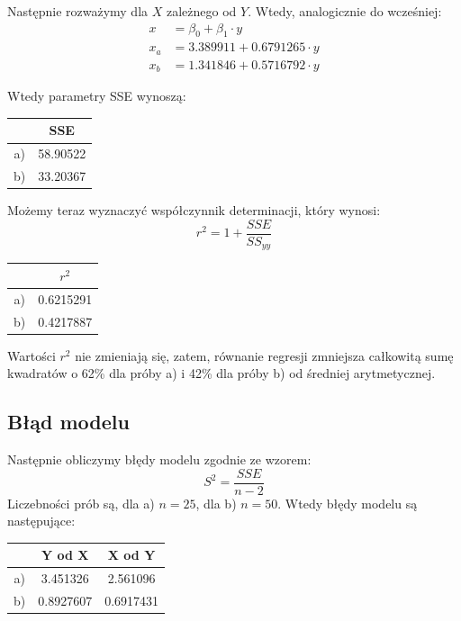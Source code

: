 \documentclass{article}
\begin{document}
Następnie rozważymy dla $X$ zależnego od $Y$. Wtedy, analogicznie do wcześniej:
\begin{align*}
x & = \beta_0 + \beta_1 \cdot y \\
x_a & = 3.389911  +  0.6791265 \cdot y \\
x_b & = 1.341846  +  0.5716792 \cdot y
\end{align*}

Wtedy parametry SSE wynoszą:
\begin{center} \begin{tabular}{|c|c|} \hline
& SSE \\ \hline
a) & 58.90522 \\ \hline
b) & 33.20367 \\ \hline
\end{tabular} \end{center}

Możemy teraz wyznaczyć współczynnik determinacji, który wynosi:
\[ r^2 = 1 + \frac{SSE}{SS_{yy}} \]
\begin{center} \begin{tabular}{|c|c|} \hline
& $r^2$ \\ \hline
a) & 0.6215291 \\ \hline
b) & 0.4217887 \\ \hline
\end{tabular} \end{center}

Wartości $r^2$ nie zmieniają się, zatem, równanie regresji zmniejsza całkowitą sumę kwadratów o 62\% dla próby a) i 42\% dla próby b) od średniej arytmetycznej.

\subsection{Błąd modelu}
Następnie obliczymy błędy modelu zgodnie ze wzorem:
\[ S^2 = \frac{SSE}{n-2} \]
Liczebności prób są, dla a) $n = 25$, dla b) $n = 50$. Wtedy błędy modelu są następujące:
\begin{center} \begin{tabular}{|c|c|c|} \hline
& Y od X & X od Y \\ \hline
a) & 3.451326 & 2.561096 \\ \hline
b) & 0.8927607 & 0.6917431 \\ \hline
\end{tabular} \end{center}
\end{document}
